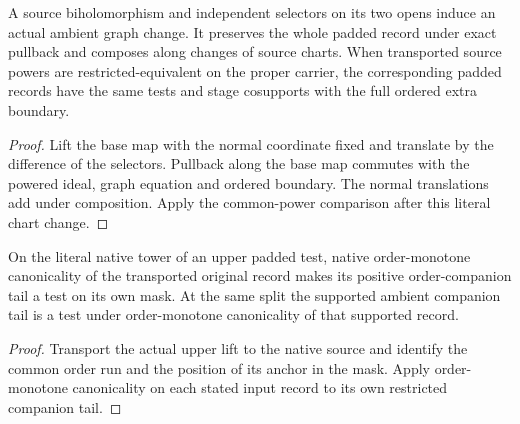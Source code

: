 \begin{theorem}
\label{hir:g1-normal-source-chart-initialization}
\leanok
A source biholomorphism and independent selectors on its two opens
induce an actual ambient graph change. It preserves the whole padded
record under exact pullback and composes along changes of source
charts. When transported source powers are restricted-equivalent
on the proper carrier, the corresponding padded records have the
same tests and stage cosupports with the full ordered extra boundary.
\end{theorem}
\begin{proof}
Lift the base map with the normal coordinate fixed and translate by
the difference of the selectors. Pullback along the base map commutes
with the powered ideal, graph equation and ordered boundary. The
normal translations add under composition. Apply the common-power
comparison after this literal chart change.
\end{proof}

\begin{theorem}
\label{hir:g1-normal-actual-order-companion-tail}
\leanok
On the literal native tower of an upper padded test, native
order-monotone canonicality of the transported original record
makes its positive order-companion tail a test on its own mask.
At the same split the supported ambient companion tail is a test
under order-monotone canonicality of that supported record.
\end{theorem}
\begin{proof}
Transport the actual upper lift to the native source and identify
the common order run and the position of its anchor in the mask.
Apply order-monotone canonicality on each stated input record to
its own restricted companion tail.
\end{proof}

